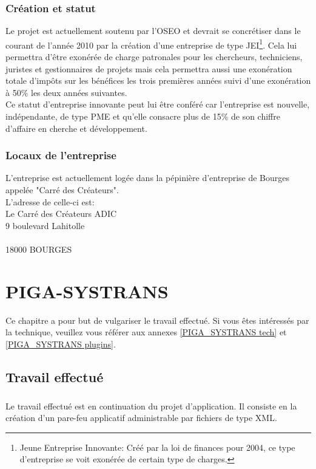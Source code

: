 		\subsection{Création et statut}
			Le projet est actuellement soutenu par l'OSEO et devrait se concrétiser dans le courant de l'année 2010 par la création d'une entreprise de type JEI\footnote{Jeune Entreprise Innovante: Créé par la loi de finances pour 2004, ce type d'entreprise se voit exonérée de certain type de charges.}. Cela lui permettra d'être exonérée de charge patronales pour les chercheurs, techniciens, juristes et gestionnaires de projets mais cela permettra aussi une exonération totale d'impôts sur les bénéfices les trois premières années suivi d'une exonération à 50\% les deux années suivantes.\\
			Ce statut d'entreprise innovante peut lui être conféré car l'entreprise est nouvelle, indépendante, de type PME et qu'elle consacre plus de 15\% de son chiffre d'affaire en cherche et développement.
		
		\subsection{Locaux de l'entreprise}
			L'entreprise est actuellement logée dans la pépinière d'entreprise de Bourges appelée "Carré des Créateurs".\\
			L'adresse de celle-ci est:\\
			Le Carré des Créateurs  ADIC\\
			9 boulevard Lahitolle\\
			\\
			18000 BOURGES

\chapter{PIGA-SYSTRANS}
	Ce chapitre a pour but de vulgariser le travail effectué. Si vous êtes intéressés par la technique, veuillez vous référer aux  annexes \ref{PIGA_SYSTRANS tech} et \ref{PIGA_SYSTRANS plugins}.
	
	\section{Travail effectué}
		\paragraph*{}
			Le travail effectué est en continuation du projet d'application. Il consiste en la création d'un pare-feu applicatif administrable par fichiers de type XML. 
			
